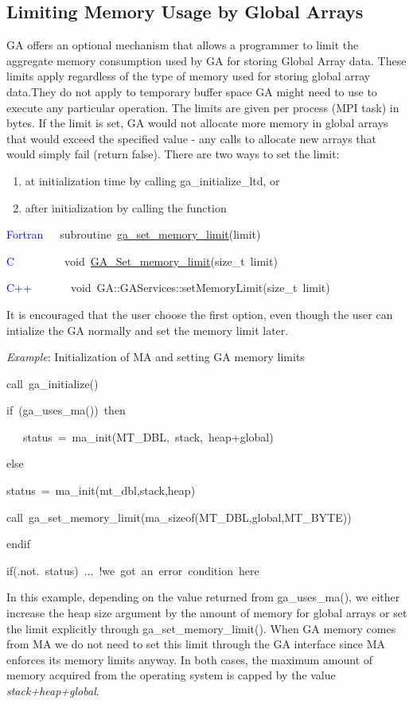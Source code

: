 \subsection{Limiting Memory Usage by Global Arrays }

GA offers an optional mechanism that allows a programmer to limit
the aggregate memory consumption used by GA for storing Global Array
data. These limits apply regardless of the type of memory used for
storing global array data.They do not apply to temporary buffer space
GA might need to use to execute any particular operation. The limits
are given per process (MPI task) in bytes. If the limit is set, GA
would not allocate more memory in global arrays that would exceed
the specified value - any calls to allocate new arrays that would
simply fail (return false). There are two ways to set the limit:
\begin{enumerate}
\item at initialization time by calling ga\_initialize\_ltd, or 
\item after initialization by calling the function\end{enumerate}
\begin{lyxcode}
\textcolor{blue}{Fortran}~~~subroutine~\href{http://www.emsl.pnl.gov/docs/global/ga_ops.html\#ga_set_memory_limit}{ga\_{}set\_{}memory\_{}limit}(limit)~

\textcolor{blue}{C}~~~~~~~~~void~\href{http://www.emsl.pnl.gov/docs/global/c_nga_ops.html\#ga_set_memory_limit}{GA\_{}Set\_{}memory\_{}limit}(size\_t~limit)~

\textcolor{blue}{C++}~~~~~~~void~GA::GAServices::setMemoryLimit(size\_t~limit)
\end{lyxcode}
It is encouraged that the user choose the first option, even though
the user can intialize the GA normally and set the memory limit later.

\emph{Example}: Initialization of MA and setting GA memory limits
\begin{lyxcode}
call~ga\_initialize()~

if~(ga\_uses\_ma())~then

~~~status~=~ma\_init(MT\_DBL,~stack,~heap+global)~

else~

status~=~ma\_init(mt\_dbl,stack,heap)~

call~ga\_set\_memory\_limit(ma\_sizeof(MT\_DBL,global,MT\_BYTE))~

endif~

if(.not.~status)~...~!we~got~an~error~condition~here
\end{lyxcode}
In this example, depending on the value returned from ga\_uses\_ma(),
we either increase the heap size argument by the amount of memory
for global arrays or set the limit explicitly through ga\_set\_memory\_limit().
When GA memory comes from MA we do not need to set this limit through
the GA interface since MA enforces its memory limits anyway. In both
cases, the maximum amount of memory acquired from the operating system
is capped by the value \emph{stack+heap+global}. 


